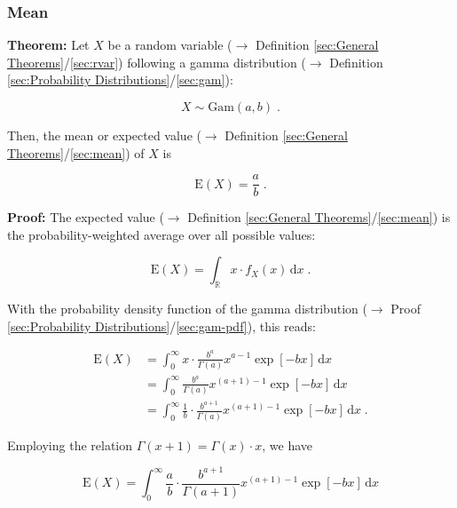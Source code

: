 \documentclass[a4paper,12pt,twoside]{book}
\begin{document}
\subsubsection[\textbf{Mean}]{Mean} \label{sec:gam-mean}
\setcounter{equation}{0}

\textbf{Theorem:} Let $X$ be a random variable ($\rightarrow$ Definition \ref{sec:General Theorems}/\ref{sec:rvar}) following a gamma distribution ($\rightarrow$ Definition \ref{sec:Probability Distributions}/\ref{sec:gam}):

\begin{equation} \label{eq:gam-mean-gam}
X \sim \mathrm{Gam}(a, b) \; .
\end{equation}

Then, the mean or expected value ($\rightarrow$ Definition \ref{sec:General Theorems}/\ref{sec:mean}) of $X$ is

\begin{equation} \label{eq:gam-mean-gam-mean}
\mathrm{E}(X) = \frac{a}{b} \; .
\end{equation}


\vspace{1em}
\textbf{Proof:} The expected value ($\rightarrow$ Definition \ref{sec:General Theorems}/\ref{sec:mean}) is the probability-weighted average over all possible values:

\begin{equation} \label{eq:gam-mean-mean}
\mathrm{E}(X) = \int_{\mathbb{R}} x \cdot f_X(x) \, \mathrm{d}x \; .
\end{equation}

With the probability density function of the gamma distribution ($\rightarrow$ Proof \ref{sec:Probability Distributions}/\ref{sec:gam-pdf}), this reads:

\begin{equation} \label{eq:gam-mean-gam-mean-s1}
\begin{split}
\mathrm{E}(X) &= \int_{0}^{\infty} x \cdot \frac{b^a}{\Gamma(a)} x^{a-1} \exp[-b x] \, \mathrm{d}x \\
&= \int_{0}^{\infty} \frac{b^a}{\Gamma(a)} x^{(a+1)-1} \exp[-b x] \, \mathrm{d}x \\
&= \int_{0}^{\infty} \frac{1}{b} \cdot \frac{b^{a+1}}{\Gamma(a)} x^{(a+1)-1} \exp[-b x] \, \mathrm{d}x \; .
\end{split}
\end{equation}

Employing the relation $\Gamma(x+1) = \Gamma(x) \cdot x$, we have

\begin{equation} \label{eq:gam-mean-gam-mean-s2}
\mathrm{E}(X) = \int_{0}^{\infty} \frac{a}{b} \cdot \frac{b^{a+1}}{\Gamma(a+1)} x^{(a+1)-1} \exp[-b x] \, \mathrm{d}x
\end{equation}
\end{document}
